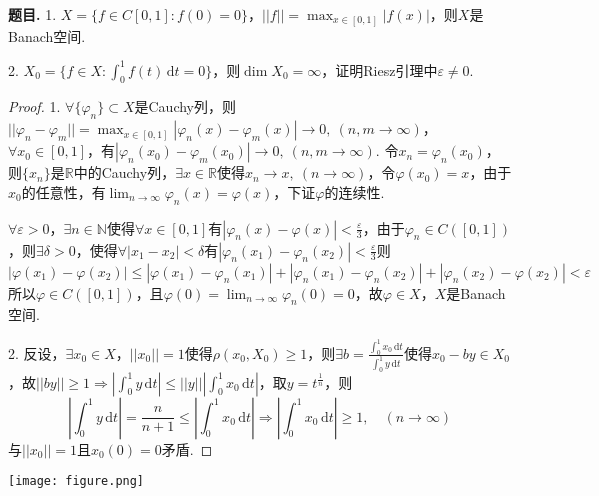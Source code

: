 \documentclass[12pt, a4paper, oneside]{ctexart}
\newcounter{problem}  %
\newenvironment{problem}{\stepcounter{problem}\par\noindent\textbf{题目\arabic{problem}. }}{\smallskip\par}
\let\leq=\leqslant %
\let\geq=\geqslant %
\def\R{\mathbb{R}}          %
\def\N{\mathbb{N}}          %
\def\d{\mathrm{d}}          %
\begin{document}
\begin{problem}
    1. $X = \{f\in C[0,1]:f(0)=0\}$，$||f||=\max_{x\in[0,1]}|f(x)|$，则$X$是Banach空间.

    2. $X_0=\{f\in X: \int_0^1f(t)\,\d t=0\}$，则$\dim X_0=\infty$，证明Riesz引理中$\varepsilon\neq 0$.
\end{problem}
\begin{proof}
    1. $\forall\{\varphi_n\}\subset X$是Cauchy列，则$||\varphi_n-\varphi_m||=\max_{x\in[0,1]}|\varphi_n(x)-\varphi_m(x)|\to0,\ (n,m\to\infty)$，$\forall x_0\in [0,1]$，有$|\varphi_n(x_0) - \varphi_m(x_0)|\to 0,\ (n,m\to\infty)$. 令$x_n = \varphi_n(x_0)$，则$\{x_n\}$是$\R$中的Cauchy列，$\exists x\in\R$使得$x_n\to x,\ (n\to\infty)$，令$\varphi(x_0) = x$，由于$x_0$的任意性，有$\lim_{n\to\infty}\varphi_n(x) = \varphi(x)$，下证$\varphi$的连续性.

    $\forall \varepsilon > 0$，$\exists n\in\N$使得$\forall x\in [0,1]$有$|\varphi_n(x)-\varphi(x)| < \frac{\varepsilon}{3}$，由于$\varphi_n\in C([0,1])$，则$\exists \delta >0$，使得$\forall |x_1-x_2| < \delta$有$|\varphi_n(x_1)-\varphi_n(x_2)| < \frac{\varepsilon}{3}$则
    \begin{equation*}
        |\varphi(x_1)-\varphi(x_2)|\leq |\varphi(x_1)-\varphi_n(x_1)|+|\varphi_n(x_1)-\varphi_n(x_2)|+|\varphi_n(x_2)-\varphi(x_2)| < \varepsilon
    \end{equation*}
    所以$\varphi\in C([0,1])$，且$\varphi(0) = \lim_{n\to\infty}\varphi_n(0) = 0$，故$\varphi \in X$，$X$是Banach空间.

    2. 反设，$\exists x_0\in X$，$||x_0|| = 1$使得$\rho(x_0, X_0)\geq 1$，则$\exists b = \frac{\int_0^1x_0\,\d t}{\int_0^1 y\,\d t}$使得$x_0-by \in X_0$，故$||by|| \geq 1\Rightarrow \left|\int_0^1y\,\d t\right|\leq ||y||\left|\int_0^1x_0\,\d t\right|$，取$y = t^{\frac{1}{n}}$，则
    \begin{equation*}
        \left|\int_0^1y\,\d t\right| = \frac{n}{n+1}\leq \left|\int_0^1x_0\,\d t\right|\Rightarrow \left|\int_0^1x_0\,\d t\right|\geq 1,\quad(n\to\infty)
    \end{equation*}
    与$||x_0|| = 1$且$x_0(0) = 0$矛盾.
\end{proof}
\iffalse
\centerline{
    \texttt{[image: figure.png]}
}
\renewcommand\arraystretch{0.8} %
\end{document}
